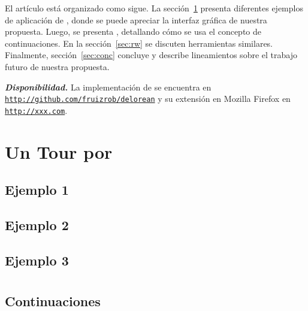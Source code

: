 \documentclass[conference]{IEEEtran}
\begin{document}
\bigskip

El art\'iculo est\'a organizado como sigue. La secci\'on~\ref{sec:tour} presenta diferentes ejemplos de aplicaci\'on de \deloreanjs, donde se puede apreciar la interfaz gr\'afica de nuestra propuesta. Luego, se presenta \deloreanjs, detallando c\'omo se usa el concepto de continuaciones. En la secci\'on~\ref{sec:rw} se discuten herramientas similares. Finalmente, secci\'on~\ref{sec:conc} concluye y describe lineamientos sobre el trabajo futuro de nuestra propuesta.      

\smallskip

{\bf {\em Disponibilidad.}} La implementaci\'on de \deloreanjs se encuentra en {\tt \url{http://github.com/fruizrob/delorean}} y su extensi\'on en Mozilla Firefox en {\tt \url{http://xxx.com}}. 



\section{Un Tour por \deloreanjs}
\label{sec:tour}


\subsection{Ejemplo 1}
\label{sec:tour1}


\subsection{Ejemplo 2}
\label{sec:tour2}


\subsection{Ejemplo 3}
\label{sec:tour3}


\bigskip

\section{\deloreanjs}
\label{sec:deloreanjs}


\subsection{Continuaciones}
\label{sec:continuaciones}
\end{document}

